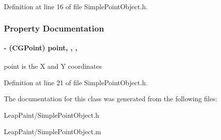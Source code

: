 Definition at line 16 of file Simple\-Point\-Object.\-h.



\subsubsection{Property Documentation}
\hypertarget{interface_simple_point_object_a9796a8e6a00e61bb255f59a80aef77d4}{
\paragraph[{point}]{\setlength{\rightskip}{0pt plus 5cm}-\/ (C\-G\-Point) point\hspace{0.3cm}{\ttfamily [read]}, {\ttfamily [write]}, {\ttfamily [nonatomic]}, {\ttfamily [assign]}}}\label{d8/d8e/interface_simple_point_object_a9796a8e6a00e61bb255f59a80aef77d4}
point is the X and Y coordinates 

Definition at line 21 of file Simple\-Point\-Object.\-h.



The documentation for this class was generated from the following files\-:\begin{DoxyCompactItemize}
\item 
Leap\-Paint/Simple\-Point\-Object.\-h\item 
Leap\-Paint/Simple\-Point\-Object.\-m\end{DoxyCompactItemize}
